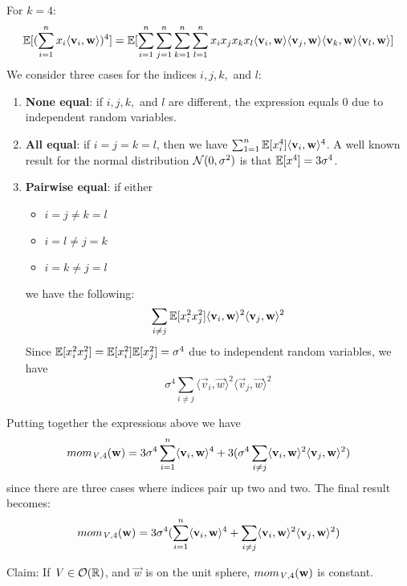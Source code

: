 For $k=4$:
\[
    \mathbb{E}[(\sum_{i=1}^{n} x_i \langle \mathbf{v}_i, \mathbf{w} \rangle)^4] = \mathbb{E}[\sum_{i=1}^{n}\sum_{j=1}^{n}\sum_{k=1}^{n}\sum_{l=1}^{n}x_i x_j x_k x_l \langle \mathbf{v}_i, \mathbf{w} \rangle \langle \mathbf{v}_j, \mathbf{w} \rangle \langle \mathbf{v}_k, \mathbf{w} \rangle \langle \mathbf{v}_l, \mathbf{w} \rangle]
\]
We consider three cases for the indices $i, j, k,$ and $l$:
\begin{enumerate}
    \item \textbf{None equal}: if $i, j, k,$ and $l$ are different, the expression equals 0 due to independent random variables.
    \item \textbf{All equal}: if $i = j = k = l$, then we have $\sum_{1=1}^{n} \mathbb{E}[x_i ^4] \langle \mathbf{v}_i, \mathbf{w} \rangle^4$. 
        A well known result for the normal distribution $\mathcal{N}(0, \sigma^2)$ is that $\mathbb{E}[x^4] = 3 \sigma^4$.
    \item \textbf{Pairwise equal}: if either 
        \begin{itemize}
            \item $i=j \neq k=l$
            \item $i=l \neq j=k$
            \item $i=k \neq j=l$
        \end{itemize}
        we have the following:
        \[
            \sum_{i\neq j} \mathbb{E}[x_i^2x_j^2] \langle \mathbf{v}_i, \mathbf{w} \rangle ^2 \langle \mathbf{v}_j, \mathbf{w} \rangle^2
        \]
        Since $\mathbb{E}[x_i^2x_j^2] = \mathbb{E}[x_i^2]\mathbb{E}[x_j^2] = \sigma^4$ due to independent random variables, we have
        \[
            \sigma^4 \sum_{i\neq j} \langle \vec{v}_i, \vec{w} \rangle ^2 \langle \vec{v}_j, \vec{w} \rangle^2
        \]
\end{enumerate}
Putting together the expressions above we have
\[mom_{\mathit{V}, 4}(\mathbf{w}) = 3 \sigma^4 \sum_{i=1}^{n} \langle \mathbf{v}_i, \mathbf{w}\rangle^4 + 3(\sigma^4 \sum_{i \neq j} \langle \mathbf{v}_i, \mathbf{w}\rangle^2 \langle \mathbf{v}_j, \mathbf{w}\rangle^2)\] 
since there are three cases where indices pair up two and two. The final result becomes:
\begin{equation}
    mom_{\mathit{V}, 4}(\mathbf{w}) = 3 \sigma^4 (\sum_{i=1}^{n} \langle \mathbf{v}_i, \mathbf{w}\rangle^4 + \sum_{i \neq j} \langle \mathbf{v}_i, \mathbf{w}\rangle^2 \langle \mathbf{v}_j, \mathbf{w}\rangle^2)
\end{equation}

Claim: If $\mathit{V} \in \mathcal{O}(\mathbb{R})$, and $\vec{w}$ is on the unit sphere, $mom_{\mathit{V}, 4}(\mathbf{w})$ is constant. 

